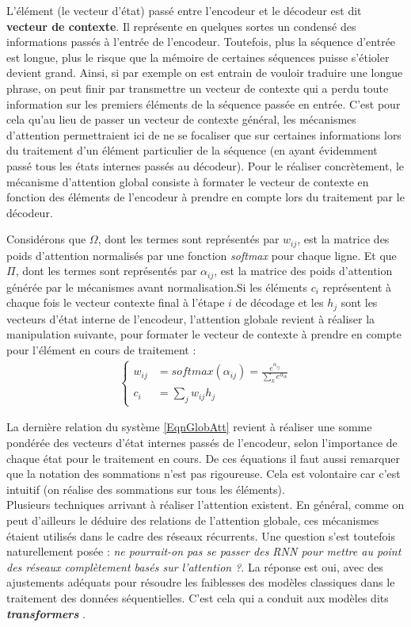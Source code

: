 L'élément (le vecteur d'état) passé entre l'encodeur et le décodeur est dit \textbf{vecteur de contexte}. Il représente en quelques sortes un condensé des informations passés à l'entrée de l'encodeur. Toutefois, plus la séquence d'entrée est longue, plus le risque que la mémoire de certaines séquences puisse  s'étioler devient grand. Ainsi, si par exemple on est entrain de vouloir traduire une longue phrase, on peut finir par transmettre un vecteur de contexte qui a perdu toute information sur les premiers éléments de la séquence passée en entrée. C'est pour cela qu'au lieu de passer un vecteur de contexte général, les mé\-ca\-nis\-mes d'attention permettraient ici de ne se focaliser que sur certaines informations lors du traitement d'un élément particulier de la séquence (en ayant évidemment passé tous les états internes passés au décodeur). Pour le réaliser concrètement, le mécanisme d'attention global consiste à formater le vecteur de contexte en fonction des éléments de l'encodeur à prendre en compte lors du traitement par le décodeur.

Considérons que $ \Omega $, dont les termes sont représentés par $ w_{ij} $, est la matrice des poids d'attention normalisés par une fonction \textit{softmax} pour chaque ligne. Et que $ \Pi $, dont les termes sont représentés par $ \alpha_{ij} $, est la matrice des poids d'attention générée par le mé\-ca\-nis\-mes avant normalisation.Si les éléments $ c_{i} $ représentent à chaque fois le vecteur contexte final à l'étape $ i $ de décodage et les $ h_{j} $ sont les vecteurs d'état interne de l'encodeur, l'attention globale revient à réaliser la manipulation suivante, pour formater le vecteur de contexte à prendre en compte pour l'élément en cours de traitement \cite{luong2015effective} :
\begin{eqnarray}\label{EqnGlobAtt}
\begin{cases}
w_{ij} &= softmax(\alpha_{ij}) = \frac{e^{\alpha_{ij}}}{\sum_{k}e^{\alpha_{ik}}}\\
c_{i} &= \sum_{j}w_{ij}h_{j}
\end{cases}
\end{eqnarray}

La dernière relation du système \ref{EqnGlobAtt} revient à réaliser une somme pondérée des vecteurs d'état internes passés de l'encodeur, selon l'importance de chaque état pour le traitement en cours. De ces équations il faut aussi remarquer que la notation des sommations n'est pas rigoureuse. Cela est volontaire car c'est intuitif (on réalise des sommations sur tous les éléments).\\
Plusieurs techniques arrivant à réaliser l'attention existent. En général, comme on peut d'ailleurs le déduire des relations de l'attention globale, ces mé\-ca\-nis\-mes étaient utilisés dans le cadre des réseaux récurrents. Une question s'est toutefois naturellement posée : \textit{ne pourrait-on pas se passer des RNN pour mettre au point des réseaux complètement basés sur l'attention ?}. La réponse est oui, avec des ajustements adéquats pour résoudre les faiblesses des modèles classiques dans le traitement des données séquentielles. C'est cela qui a conduit aux modèles dits \textbf{\textit{transformers}} \cite{vaswani2017attention}.
